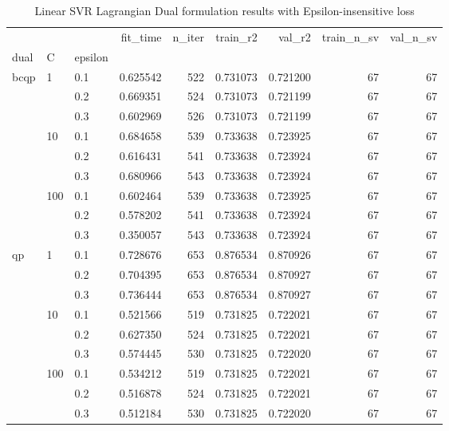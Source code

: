 \begin{table}[h!]
\centering
\caption{Linear SVR Lagrangian Dual formulation results with Epsilon-insensitive loss}
\label{linear_lagrangian_dual_svr_cv_results}
\begin{tabular}{lllrrrrrr}
\toprule
   &     &     &  fit\_time &  n\_iter &  train\_r2 &    val\_r2 &  train\_n\_sv &  val\_n\_sv \\
dual & C & epsilon &           &         &           &           &             &           \\
\midrule
bcqp & 1   & 0.1 &  0.625542 &     522 &  0.731073 &  0.721200 &          67 &        67 \\
   &     & 0.2 &  0.669351 &     524 &  0.731073 &  0.721199 &          67 &        67 \\
   &     & 0.3 &  0.602969 &     526 &  0.731073 &  0.721199 &          67 &        67 \\
   & 10  & 0.1 &  0.684658 &     539 &  0.733638 &  0.723925 &          67 &        67 \\
   &     & 0.2 &  0.616431 &     541 &  0.733638 &  0.723924 &          67 &        67 \\
   &     & 0.3 &  0.680966 &     543 &  0.733638 &  0.723924 &          67 &        67 \\
   & 100 & 0.1 &  0.602464 &     539 &  0.733638 &  0.723925 &          67 &        67 \\
   &     & 0.2 &  0.578202 &     541 &  0.733638 &  0.723924 &          67 &        67 \\
   &     & 0.3 &  0.350057 &     543 &  0.733638 &  0.723924 &          67 &        67 \\
qp & 1   & 0.1 &  0.728676 &     653 &  0.876534 &  0.870926 &          67 &        67 \\
   &     & 0.2 &  0.704395 &     653 &  0.876534 &  0.870927 &          67 &        67 \\
   &     & 0.3 &  0.736444 &     653 &  0.876534 &  0.870927 &          67 &        67 \\
   & 10  & 0.1 &  0.521566 &     519 &  0.731825 &  0.722021 &          67 &        67 \\
   &     & 0.2 &  0.627350 &     524 &  0.731825 &  0.722021 &          67 &        67 \\
   &     & 0.3 &  0.574445 &     530 &  0.731825 &  0.722020 &          67 &        67 \\
   & 100 & 0.1 &  0.534212 &     519 &  0.731825 &  0.722021 &          67 &        67 \\
   &     & 0.2 &  0.516878 &     524 &  0.731825 &  0.722021 &          67 &        67 \\
   &     & 0.3 &  0.512184 &     530 &  0.731825 &  0.722020 &          67 &        67 \\
\bottomrule
\end{tabular}
\end{table}
